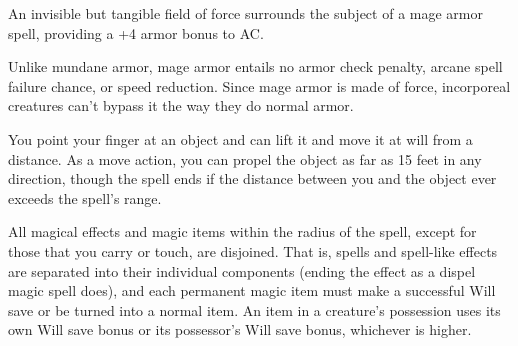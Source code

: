 \begin{multicols}{2}
\begin{small}
\noindent An invisible but tangible field of force surrounds the subject of a mage armor spell, providing a +4 armor bonus to AC.

\smallskip\noindent Unlike mundane armor, mage armor entails no armor check penalty, arcane spell failure chance, or speed reduction. Since mage armor is made of force, incorporeal creatures can't bypass it the way they do normal armor.


\noindent You point your finger at an object and can lift it and move it at will from a distance. As a move action, you can propel the object as far as 15 feet in any direction, though the spell ends if the distance between you and the object ever exceeds the spell's range.

\noindent All magical effects and magic items within the radius of the spell, except for those that you carry or touch, are disjoined. That is, spells and spell-like effects are separated into their individual components (ending the effect as a dispel magic spell does), and each permanent magic item must make a successful Will save or be turned into a normal item. An item in a creature's possession uses its own Will save bonus or its possessor's Will save bonus, whichever is higher.


\end{small}
\end{multicols}
